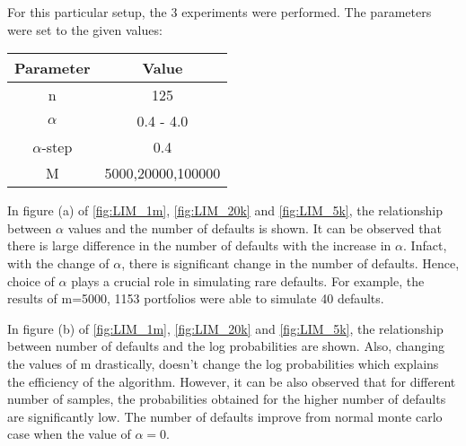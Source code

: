 For this particular setup, the 3 experiments were performed. The parameters were set to the given values:
\begin{center}
	\begin{tabular}{|c|c|}
		\hline
		Parameter      & Value                              \\
		\hline
		\hline
		n & 125 \\
		\hline
		$\alpha$ & 0.4 - 4.0 \\
		\hline
		$\alpha$-step & 0.4 \\
		\hline
		M & 5000,20000,100000 \\
		\hline
	\end{tabular}
\end{center}

In figure (a) of \ref{fig:LIM_1m}, \ref{fig:LIM_20k} and \ref{fig:LIM_5k}, the relationship between $\alpha$ values and the number of defaults is shown. It can be observed that there is large difference in the number of defaults with the increase in $\alpha$. Infact, with the change of $\alpha$, there is significant change in the number of defaults. Hence, choice of $\alpha$ plays a crucial role in simulating rare defaults. For example, the results of m=5000, 1153 portfolios were able to simulate 40 defaults. 

In figure (b) of \ref{fig:LIM_1m}, \ref{fig:LIM_20k} and \ref{fig:LIM_5k}, the relationship between number of defaults and the log probabilities are shown. Also, changing the values of m drastically, doesn't change the log probabilities which explains the efficiency of the algorithm. However, it can be also observed that for different number of samples, the probabilities obtained for the higher number of defaults are significantly low. The number of defaults improve from normal monte carlo case when the value of $\alpha=0$. 